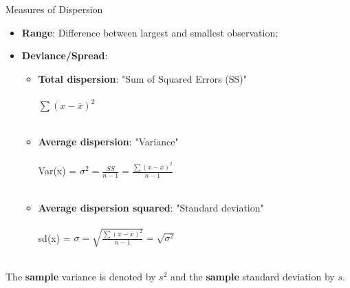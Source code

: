 \documentclass[10pt]{beamer}   %
\begin{document}
\begin{frame}{Measures of Dispersion}

\begin{itemize}
\item \textbf{Range}: Difference between largest and smallest observation; 
\item  \textbf{Deviance/Spread}:
\begin{itemize}
      \item \textbf{Total dispersion}: "Sum of Squared Errors (SS)"  \\~\\  $\sum(x-\bar{x})^{2}$  \\~\\ %
      \item \textbf{Average dispersion}: "Variance"  \\~\\  Var(x) = $\sigma^{2}= \frac{SS}{n-1} =\frac{\sum(x-\bar{x})^{2}}{n-1}$ \\~\\  %
      \item \textbf{Average dispersion squared}: "Standard deviation" \\~\\ sd(x) = $\sigma=\sqrt{\frac{\sum(x-\bar{x})^{2}}{n-1}} = \sqrt{\sigma^{2}}$  \\~\\ 
\end{itemize}
\end{itemize}
The \textbf{sample} variance is denoted by $s^2$ and the  \textbf{sample} standard deviation by $s$.

\end{frame}






\end{document}
